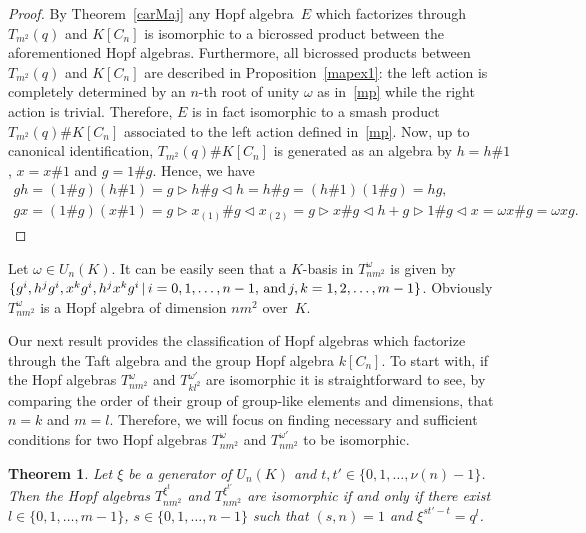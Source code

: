 \documentclass[11pt]{article}
\numberwithin{equation}{section}
\newtheorem{Theorem}{Theorem}[section]
\begin{document}
\begin{proof} By Theorem~\ref{carMaj} any Hopf algebra~$E$ which factorizes through $T_{m^{2}}(q)$ and $K[C_n]$ is isomorphic to a bicrossed product
between the aforementioned Hopf algebras. Furthermore, all bicrossed products between $T_{m^{2}}(q)$ and $K[C_n]$ are described in Proposition~\ref{mapex1}: the left action is completely determined by an $n$-th root of unity $\omega$ as in~\eqref{mp} while the right action is trivial. Therefore, $E$ is in fact isomorphic to a smash product $T_{m^{2}}(q) \# K[C_n]$ associated to the left action defined in~\eqref{mp}. Now, up to canonical identification, $T_{m^{2}}(q) \# K[C_n]$ is generated as an algebra by $h = h \# 1$, $x = x \# 1$ and $g = 1\# g$. Hence, we have
\begin{gather*}
gh = (1\# g) (h \# 1)= g \triangleright h \# g \triangleleft h = h \# g = (h \# 1)(1 \# g) = hg,\\
g x = (1 \# g) (x \# 1) = g \triangleright x_{(1)}
\# g \triangleleft x_{(2)} = g \triangleright x \# g \triangleleft h + g \triangleright 1 \# g \triangleleft x =\omega x \# g = \omega x g. \tag*{\qed}
\end{gather*}\renewcommand{\qed}{}
\end{proof}
\begin{Remark}Let $\omega \in U_{n}(K)$. It can be easily seen that a $K$-basis in $T_{nm^{2}}^ {\omega}$ is given by $\{ g^{i}, h^{j} g^{i},
 x^{k} g^{i}, h^{j} x^{k} g^{i} \,| \,i = 0, 1,\dots, n-1, \,{\rm and}\, j, k = 1, 2,\dots, m-1 \}$. Obviously $T_{nm^{2}}^ {\omega}$ is a Hopf algebra of dimension $nm^{2}$ over~$K$.
\end{Remark}

Our next result provides the classification of Hopf algebras which factorize through the Taft algebra and the group Hopf algebra $k[C_{n}]$. To start with, if the Hopf algebras $T_{nm^{2}}^{\omega}$ and $T_{kl^{2}}^ {\omega '}$ are isomorphic it is straightforward to see, by comparing the order of their group of group-like elements and dimensions, that $n=k$ and $m=l$. Therefore, we will focus on finding necessary and sufficient conditions for two Hopf algebras $T_{nm^{2}}^ {\omega}$ and $T_{nm^{2}}^ {\omega '}$ to be isomorphic.

\begin{Theorem}\label{izo} Let $\xi$ be a generator of $U_n (K)$ and $t, t' \in \{ 0, 1,\dots, \nu (n) -1 \}$. Then the Hopf algebras $T_{nm^{2}}^ {\xi^{t}}$ and $T_{nm^{2}}^ {\xi^{t'}}$ are isomorphic if and only if there exist $l \in \{ 0, 1,\dots, m-1 \}$, $s \in \{ 0, 1,\dots, n-1 \}$ such that $(s, n) = 1$ and $\xi^{st' - t} = q^{l}$.
\end{Theorem}
\end{document}
